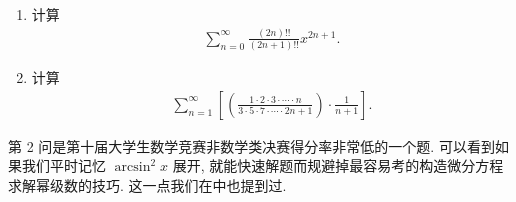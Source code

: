 \documentclass[../../main.tex]{subfiles}%
\begin{document}
\begin{example}
\begin{enumerate}
\item 计算
\begin{align*}
\sum_{n=0}^{\infty} \frac{(2n)!!}{(2n + 1)!!} x^{2n + 1}.
\end{align*}
\item 计算
\begin{align*}
\sum_{n=1}^{\infty} \left[ \left( \frac{1 \cdot 2 \cdot 3 \cdot \cdots \cdot n}{3 \cdot 5 \cdot 7 \cdot \cdots \cdot 2n + 1} \right) \cdot \frac{1}{n + 1} \right].
\end{align*}
\end{enumerate}
\end{example}
\begin{remark}
第 2 问是第十届大学生数学竞赛非数学类决赛得分率非常低的一个题. 可以看到如果我们平时记忆 $\arcsin^2 x$ 展开, 就能快速解题而规避掉最容易考的构造微分方程求解幂级数的技巧. 这一点我们在中也提到过.
\end{remark}
\end{document}

